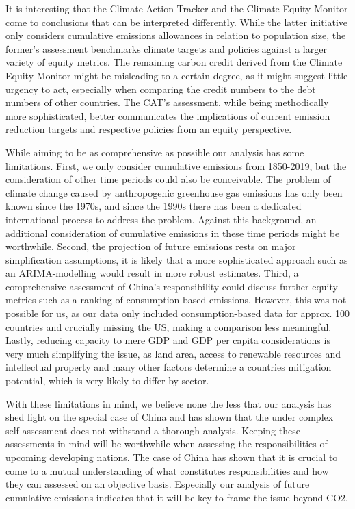 \documentclass[
  12pt,
]{article}
\numberwithin{equation}{section}
\numberwithin{table}{section}
\numberwithin{figure}{section}
\begin{document}
It is interesting that the Climate Action Tracker and the Climate Equity
Monitor come to conclusions that can be interpreted differently. While
the latter initiative only considers cumulative emissions allowances in
relation to population size, the former's assessment benchmarks climate
targets and policies against a larger variety of equity metrics. The
remaining carbon credit derived from the Climate Equity Monitor might be
misleading to a certain degree, as it might suggest little urgency to
act, especially when comparing the credit numbers to the debt numbers of
other countries. The CAT's assessment, while being methodically more
sophisticated, better communicates the implications of current emission
reduction targets and respective policies from an equity perspective.

While aiming to be as comprehensive as possible our analysis has some
limitations. First, we only consider cumulative emissions from
1850-2019, but the consideration of other time periods could also be
conceivable. The problem of climate change caused by anthropogenic
greenhouse gas emissions has only been known since the 1970s, and since
the 1990s there has been a dedicated international process to address
the problem. Against this background, an additional consideration of
cumulative emissions in these time periods might be worthwhile. Second,
the projection of future emissions rests on major simplification
assumptions, it is likely that a more sophisticated approach such as an
ARIMA-modelling would result in more robust estimates. Third, a
comprehensive assessment of China's responsibility could discuss further
equity metrics such as a ranking of consumption-based emissions.
However, this was not possible for us, as our data only included
consumption-based data for approx. 100 countries and crucially missing
the US, making a comparison less meaningful. Lastly, reducing capacity
to mere GDP and GDP per capita considerations is very much simplifying
the issue, as land area, access to renewable resources and intellectual
property and many other factors determine a countries mitigation
potential, which is very likely to differ by sector.

With these limitations in mind, we believe none the less that our
analysis has shed light on the special case of China and has shown that
the under complex self-assessment does not withstand a thorough
analysis. Keeping these assessments in mind will be worthwhile when
assessing the responsibilities of upcoming developing nations. The case
of China has shown that it is crucial to come to a mutual understanding
of what constitutes responsibilities and how they can assessed on an
objective basis. Especially our analysis of future cumulative emissions
indicates that it will be key to frame the issue beyond CO2.
\end{document}
